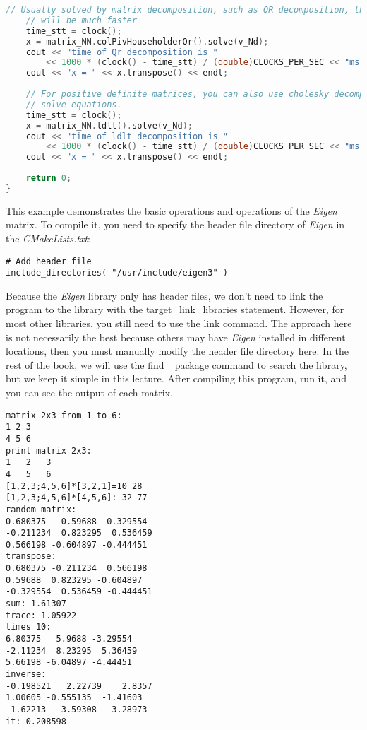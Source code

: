 \begin{lstlisting}[language=c++,caption=slambook2/ch3/useEigen/eigenMatrix.cpp]
    // Usually solved by matrix decomposition, such as QR decomposition, the speed
    // will be much faster
    time_stt = clock();
    x = matrix_NN.colPivHouseholderQr().solve(v_Nd);
    cout << "time of Qr decomposition is "
	    << 1000 * (clock() - time_stt) / (double)CLOCKS_PER_SEC << "ms" << endl;
    cout << "x = " << x.transpose() << endl;
    
    // For positive definite matrices, you can also use cholesky decomposition to
    // solve equations.
    time_stt = clock();
    x = matrix_NN.ldlt().solve(v_Nd);
    cout << "time of ldlt decomposition is "
	    << 1000 * (clock() - time_stt) / (double)CLOCKS_PER_SEC << "ms" << endl;
    cout << "x = " << x.transpose() << endl;
    
    return 0;
}
\end{lstlisting}

This example demonstrates the basic operations and operations of the \textit{Eigen} matrix. To compile it, you need to specify the header file directory of \textit{Eigen} in the \textit{CMakeLists.txt}:
\begin{lstlisting}[caption=slambook2/ch3/useEigen/CMakeLists.txt]
# Add header file
include_directories( "/usr/include/eigen3" )
\end{lstlisting}

Because the \textit{Eigen} library only has header files, we don't need to link the program to the library with the target\_link\_libraries statement. However, for most other libraries, you still need to use the link command. The approach here is not necessarily the best because others may have \textit{Eigen} installed in different locations, then you must manually modify the header file directory here. In the rest of the book, we will use the find\_ package command to search the library, but we keep it simple in this lecture. After compiling this program, run it, and you can see the output of each matrix.

\begin{lstlisting}[caption=Terminal output:]
% build/eigenMatrix
matrix 2x3 from 1 to 6: 
1 2 3
4 5 6
print matrix 2x3: 
1	2	3	
4	5	6	
[1,2,3;4,5,6]*[3,2,1]=10 28
[1,2,3;4,5,6]*[4,5,6]: 32 77
random matrix: 
0.680375   0.59688 -0.329554
-0.211234  0.823295  0.536459
0.566198 -0.604897 -0.444451
transpose: 
0.680375 -0.211234  0.566198
0.59688  0.823295 -0.604897
-0.329554  0.536459 -0.444451
sum: 1.61307
trace: 1.05922
times 10: 
6.80375   5.9688 -3.29554
-2.11234  8.23295  5.36459
5.66198 -6.04897 -4.44451
inverse: 
-0.198521   2.22739    2.8357
1.00605 -0.555135  -1.41603
-1.62213   3.59308   3.28973
it: 0.208598
\end{lstlisting}

